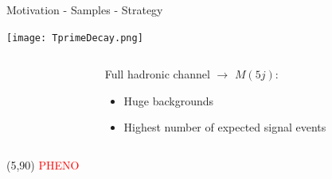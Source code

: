 \begin{frame}{Motivation - Samples - Strategy}
\vspace{-1.0cm}

\begin{center}
  \texttt{[image: TprimeDecay.png]}
\end{center}

\vspace{-.5cm}
\begin{columns}
\begin{column}{.60\textwidth}
\end{column}
\begin{column}{.40\textwidth}
\begin{block}{}\tiny
Full hadronic channel $\to$ $M(5j)$:
  \begin{itemize}\tiny
  \item Huge backgrounds
  \item Highest number of expected signal events
  \end{itemize}
\end{block}
\end{column}
\end{columns}

\begin{textblock}{50}(5,90)
\textcolor{red}{PHENO}
\end{textblock}

\end{frame}

